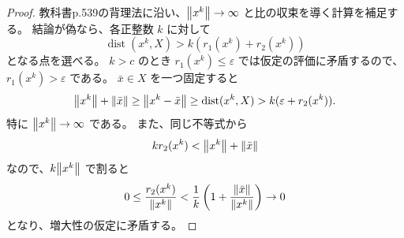 \documentclass[12pt,dvipdfmx]{article}
\theoremstyle{plain}
\begin{document}
\begin{proof}
    教科書p.539の背理法に沿い、$\norm{x^k} \to \infty$ と比の収束を導く計算を補足する。
    結論が偽なら、各正整数 $k$ に対して
    \begin{equation*}
        \operatorname{dist}(x^k, X) > k(r_1(x^k) + r_2(x^k))
    \end{equation*}
    となる点を選べる。
    $k > c$ のとき $r_1(x^k) \leq \varepsilon$ では仮定の評価に矛盾するので、$r_1(x^k) > \varepsilon$ である。
    $\bar x \in X$ を一つ固定すると
    \begin{equation*}
        \norm{x^k} + \norm{\bar x}
        \geq \norm{x^k - \bar x}
        \geq \operatorname{dist}(x^k, X)
        > k(\varepsilon + r_2(x^k)).
    \end{equation*}
    特に $\norm{x^k} \to \infty$ である。
    また、同じ不等式から
    \begin{equation*}
        k r_2(x^k) < \norm{x^k} + \norm{\bar x}
    \end{equation*}
    なので、$k\norm{x^k}$ で割ると
    \begin{equation*}
        0 \leq \frac{r_2(x^k)}{\norm{x^k}}
        < \frac{1}{k}\left(1 + \frac{\norm{\bar x}}{\norm{x^k}}\right) \to 0
    \end{equation*}
    となり、増大性の仮定に矛盾する。
\end{proof}
\end{document}
